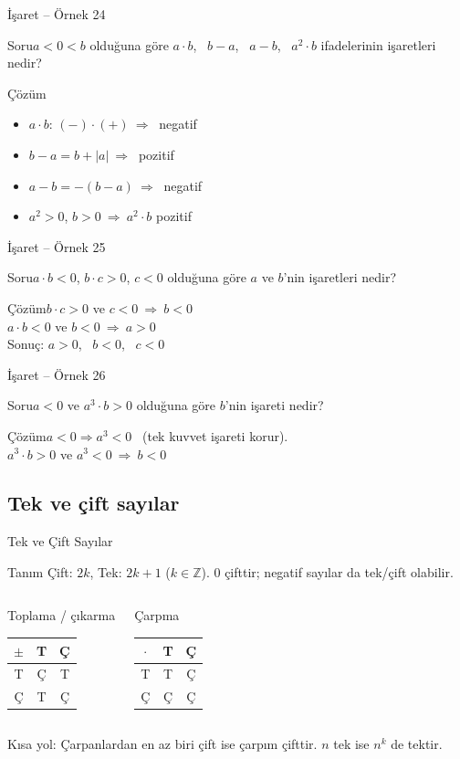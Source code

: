 \documentclass[aspectratio=169,11pt]{beamer}
\newcommand{\soru}[3]{%
\begin{frame}{#1}
  \begin{block}{Soru}\large #2\end{block}
  \pause
  \begin{exampleblock}{Çözüm}\large #3\end{exampleblock}
\end{frame}}
\begin{document}
\soru{İşaret -- Örnek 24}
{\(a<0<b\) olduğuna göre \(a\cdot b\), \ \(b-a\), \ \(a-b\), \ \(a^2\cdot b\) ifadelerinin işaretleri nedir?}
{\begin{itemize}
\item \(a\cdot b\): \((-)\cdot(+)\ \Rightarrow\ \) negatif
\item \(b-a=b+|a|\ \Rightarrow\ \) pozitif
\item \(a-b=-(b-a)\ \Rightarrow\ \) negatif
\item \(a^2>0\), \(b>0\ \Rightarrow\ a^2\cdot b\) pozitif
\end{itemize}}

\soru{İşaret -- Örnek 25}
{\(a\cdot b<0\), \quad \(b\cdot c>0\), \quad \(c<0\) olduğuna göre \(a\) ve \(b\)'nin işaretleri nedir?}
{\(b\cdot c>0\) ve \(c<0\ \Rightarrow\ b<0\)\\[3pt]
\(a\cdot b<0\) ve \(b<0\ \Rightarrow\ a>0\)\\[3pt]
Sonuç: \(a>0\), \ \(b<0\), \ \(c<0\)}

\soru{İşaret -- Örnek 26}
{\(a<0\) ve \(a^3\cdot b>0\) olduğuna göre \(b\)'nin işareti nedir?}
{\(a<0\Rightarrow a^3<0\) \ (tek kuvvet işareti korur).\\[3pt]
\(a^3\cdot b>0\) ve \(a^3<0\ \Rightarrow\ b<0\)}

\subsection{Tek ve çift sayılar}
\begin{frame}{Tek ve Çift Sayılar}
\begin{block}{Tanım}
Çift: \(2k\), \quad Tek: \(2k+1\) \qquad (\(k\in\mathbb{Z}\)). \quad \(0\) çifttir; negatif sayılar da tek/çift olabilir.
\end{block}
\begin{columns}[t]
\begin{block}{Toplama / çıkarma}
\begin{tabular}{c|cc}
\(\pm\) & T & Ç\\\hline
T & Ç & T\\
Ç & T & Ç
\end{tabular}
\end{block}
\begin{block}{Çarpma}
\begin{tabular}{c|cc}
\(\cdot\) & T & Ç\\\hline
T & T & Ç\\
Ç & Ç & Ç
\end{tabular}
\end{block}
\end{columns}
\vspace{4pt}
Kısa yol: Çarpanlardan en az biri çift ise çarpım çifttir. \(n\) tek ise \(n^k\) de tektir.
\end{frame}
\end{document}
